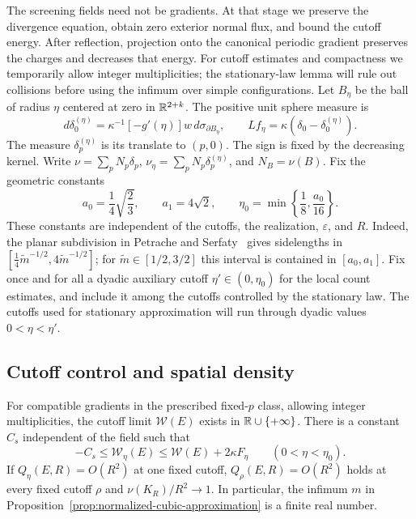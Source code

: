 The screening fields need not be gradients.  At that stage we preserve
the divergence equation, obtain zero exterior normal flux, and bound the
cutoff energy.  After reflection, projection onto the canonical periodic
gradient preserves the charges and decreases that energy.
For cutoff estimates and compactness we temporarily allow integer
multiplicities; the stationary-law lemma will rule out collisions before
using the infimum over simple configurations.
Let $B_\eta$ be the ball of radius $\eta$ centered at zero in
$\mathbb R^{2+k}$. The positive unit sphere measure is
\[
 d\delta_0^{(\eta)}
   =\kappa^{-1}[-g'(\eta)]w\,d\sigma_{\partial B_\eta},
 \qquad Lf_\eta=\kappa(\delta_0-\delta_0^{(\eta)}).
\]
The measure $\delta_p^{(\eta)}$ is its translate to $(p,0)$.
The sign is fixed by the decreasing kernel. 
Write $\nu=\sum_pN_p\delta_p$, $\nu_\eta=\sum_pN_p\delta_p^{(\eta)}$,
and $N_B=\nu(B)$.
Fix the geometric constants
\[
 a_0=\frac14\sqrt{\frac23},\qquad a_1=4\sqrt2,
 \qquad \eta_0=\min\left\{\frac18,\frac{a_0}{16}\right\}.
\]
These constants are independent of the cutoffs, the realization,
$\varepsilon$, and $R$.  Indeed, the planar subdivision in
Petrache and Serfaty~\citep[Lemma~6.3]{PetracheSerfaty2017} gives sidelengths in
$[\frac14\widetilde m^{-1/2},4\widetilde m^{-1/2}]$;
for $\widetilde m\in[1/2,3/2]$ this interval is contained in
$[a_0,a_1]$.  Fix once and for all a dyadic auxiliary cutoff
$\eta'\in(0,\eta_0)$ for the local count estimates, and include it
among the cutoffs controlled by the stationary law.  The cutoffs used for
stationary approximation will run through dyadic values $0<\eta<\eta'$.


\subsection{Cutoff control and spatial density}

\begin{lemma}\label{lem:field-cutoff-control}
For compatible gradients in the prescribed fixed-$p$ class, allowing
integer multiplicities, the cutoff limit $\mathcal W(E)$ exists in
$\mathbb R\cup\{+\infty\}$. There is a constant $C_s$ independent of the field
such that
\[
 -C_s\le\mathcal W_\eta(E)\le\mathcal W(E)+2\kappa F_\eta
 \qquad(0<\eta<\eta_0).
\]
If $Q_\eta(E,R)=O(R^2)$ at one fixed cutoff, $Q_\rho(E,R)=O(R^2)$ holds at every
fixed cutoff $\rho$ and $\nu(K_R)/R^2\to1$. In particular, the infimum $m$ in
Proposition~\ref{prop:normalized-cubic-approximation} is a finite real number.
\end{lemma}


